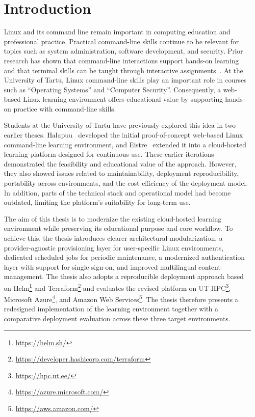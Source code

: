 

\section{Introduction} \label{sec:introduction}
Linux and its command line remain important in computing education and professional practice.
Practical command-line skills continue to be relevant for topics such as system administration, software development, and security.
Prior research has shown that command-line interactions support hands-on learning and that terminal skills can be taught through interactive assignments~\cite{svabensky_toolset_2021,bailey_uassign_2019}.
At the University of Tartu, Linux command-line skills play an important role in courses such as ``Operating Systems'' and ``Computer Security''.
Consequently, a web-based Linux learning environment offers educational value by supporting hands-on practice with command-line skills.

Students at the University of Tartu have previously explored this idea in two earlier theses.
Halapuu~\cite{halapuu_2022} developed the initial proof-of-concept web-based Linux command-line learning environment, and Eistre~\cite{eistre_2024} extended it into a cloud-hosted learning platform designed for continuous use.
These earlier iterations demonstrated the feasibility and educational value of the approach.
However, they also showed issues related to maintainability, deployment reproducibility, portability across environments, and the cost efficiency of the deployment model.
In addition, parts of the technical stack and operational model had become outdated, limiting the platform's suitability for long-term use.

The aim of this thesis is to modernize the existing cloud-hosted learning environment while preserving its educational purpose and core workflow.
To achieve this, the thesis introduces clearer architectural modularization, a provider-agnostic provisioning layer for user-specific Linux environments, dedicated scheduled jobs for periodic maintenance, a modernized authentication layer with support for single sign-on, and improved multilingual content management.
The thesis also adopts a reproducible deployment approach based on Helm\footnote{\url{https://helm.sh/}} and Terraform\footnote{\url{https://developer.hashicorp.com/terraform}} and evaluates the revised platform on UT HPC\footnote{\url{https://hpc.ut.ee/}}, Microsoft Azure\footnote{\url{https://azure.microsoft.com/}}, and Amazon Web Services\footnote{\url{https://aws.amazon.com/}}.
The thesis therefore presents a redesigned implementation of the learning environment together with a comparative deployment evaluation across these three target environments.

